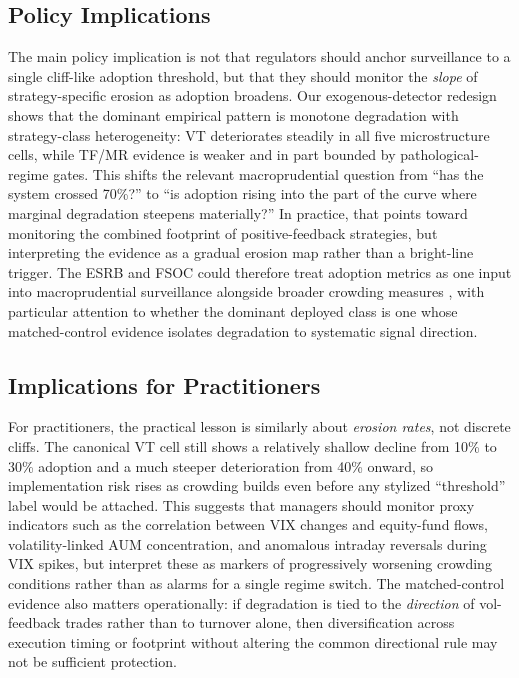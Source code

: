\documentclass[12pt,a4paper]{article}
\begin{document}
\subsection{Policy Implications}

The main policy implication is not that regulators should anchor surveillance to a single cliff-like adoption threshold, but that they should monitor the \emph{slope} of strategy-specific erosion as adoption broadens. Our exogenous-detector redesign shows that the dominant empirical pattern is monotone degradation with strategy-class heterogeneity: VT deteriorates steadily in all five microstructure cells, while TF/MR evidence is weaker and in part bounded by pathological-regime gates. This shifts the relevant macroprudential question from ``has the system crossed 70\%?'' to ``is adoption rising into the part of the curve where marginal degradation steepens materially?'' In practice, that points toward monitoring the combined footprint of positive-feedback strategies, but interpreting the evidence as a gradual erosion map rather than a bright-line trigger. The ESRB and FSOC could therefore treat adoption metrics as one input into macroprudential surveillance alongside broader crowding measures \citep{baltas2019}, with particular attention to whether the dominant deployed class is one whose matched-control evidence isolates degradation to systematic signal direction.

\subsection{Implications for Practitioners}

For practitioners, the practical lesson is similarly about \emph{erosion rates}, not discrete cliffs. The canonical VT cell still shows a relatively shallow decline from 10\% to 30\% adoption and a much steeper deterioration from 40\% onward, so implementation risk rises as crowding builds even before any stylized ``threshold'' label would be attached. This suggests that managers should monitor proxy indicators such as the correlation between VIX changes and equity-fund flows, volatility-linked AUM concentration, and anomalous intraday reversals during VIX spikes, but interpret these as markers of progressively worsening crowding conditions rather than as alarms for a single regime switch. The matched-control evidence also matters operationally: if degradation is tied to the \emph{direction} of vol-feedback trades rather than to turnover alone, then diversification across execution timing or footprint without altering the common directional rule may not be sufficient protection.
\end{document}
